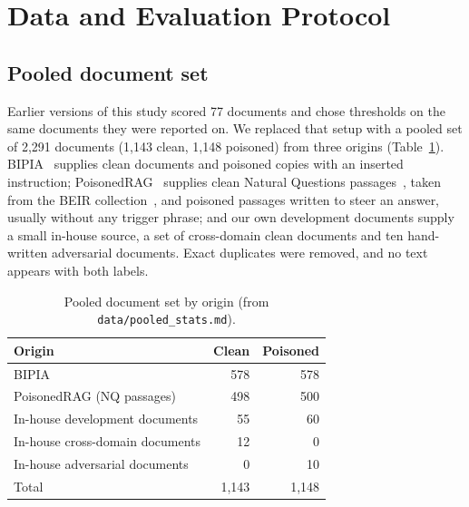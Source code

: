\section{Data and Evaluation Protocol}
\label{sec:protocol}

\subsection{Pooled document set}
Earlier versions of this study scored 77 documents and chose thresholds on the
same documents they were reported on. We replaced that setup with a pooled set
of 2{,}291 documents (1{,}143 clean, 1{,}148 poisoned) from three origins
(Table~\ref{tab:pool}). BIPIA~\cite{yi2023benchmarking} supplies clean
documents and poisoned copies with an inserted instruction; PoisonedRAG~\cite{zou2024poisonedrag}
supplies clean Natural Questions passages~\cite{kwiatkowski2019nq}, taken from
the BEIR collection~\cite{thakur2021beir}, and
poisoned passages written to steer an answer, usually without any trigger
phrase; and our own development documents supply a small in-house source, a
set of cross-domain clean documents and ten hand-written adversarial documents.
Exact duplicates were removed, and no text appears with both labels.

\begin{table}[t]
\caption{Pooled document set by origin (from \texttt{data/pooled\_stats.md}).}
\label{tab:pool}
\centering
\footnotesize
\begin{tabular}{@{}lrr@{}}
\toprule
Origin & Clean & Poisoned \\
\midrule
BIPIA & 578 & 578 \\
PoisonedRAG (NQ passages) & 498 & 500 \\
In-house development documents & 55 & 60 \\
In-house cross-domain documents & 12 & 0 \\
In-house adversarial documents & 0 & 10 \\
\midrule
Total & 1{,}143 & 1{,}148 \\
\bottomrule
\end{tabular}
\end{table}



